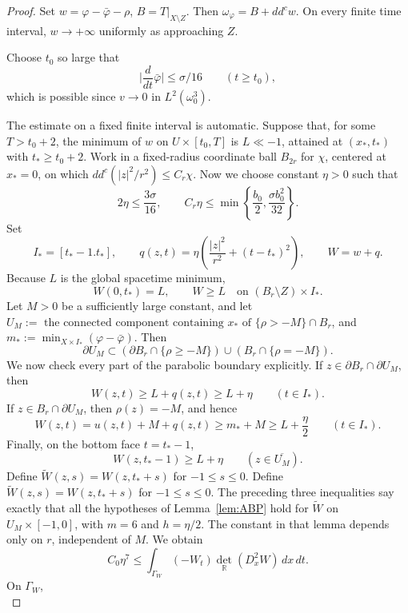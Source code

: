 \documentclass[reqno]{amsart}
\theoremstyle{remark}
\theoremstyle{plain}
\begin{document}
\begin{proof}
    Set $w=\varphi-\bar{\varphi}-\rho$, $B=T|_{X\setminus Z}$. Then $\omega_\varphi=B+dd^cw$. 
On every finite time interval, $w\to+\infty$ uniformly as approaching 
$Z$.

Choose $t_0$ so large that
\[
\big|\frac{d}{dt}\bar{\varphi}\big|\leq\sigma/16\qquad(t\geq t_0),
\]which is possible since $v\to 0$ in $L^2(\omega_0^3)$. 

The estimate on a fixed finite interval is automatic.  Suppose that,
for some $T>t_0+2$, the minimum of $w$ on
$U\times[t_0,T]$ is $L\ll-1$, attained at
$(x_*,t_*)$ with $t_*\geq t_0+2$.  Work in a fixed-radius
coordinate ball $B_{2r}$ for $\chi$, centered
at $x_*=0$, on which $dd^c(|z|^2/r^2)\leq C_r\chi$. Now we choose constant $\eta>0$ such that \begin{equation}\label{eq:eta-choice}
 2\eta\leq\frac{3\sigma}{16},\qquad
 C_r\eta\leq
 \min\left\{\frac{b_0}{2},\frac{\sigma b_0^2}{32}\right\}.
\end{equation}
Set \[
I_*=[t_*-1.t_*], \qquad q(z,t)=\eta\left(\frac{|z|^2}{r^2}+(t-t_*)^2\right),
 \qquad W=w+q.
\]
Because $L$ is the global spacetime minimum,
\[
 W(0,t_*)=L,\qquad W\geq L
 \quad\text{on }(B_r\setminus Z)\times I_*.
\]
Let $M>0$ be a sufficiently large constant, and let $U_M:=\text{ the connected component containing $x_*$ of }\{\rho>-M\}\cap B_{r}$, and $m_*:=\min_{X\times I_*}(\varphi-\bar\varphi).$ Then \[
\partial U_M\subset (\partial B_r\cap\{\rho\geq -M\})\cup(B_r\cap\{\rho=-M\}).
\]
We now check every part of the parabolic boundary explicitly.  If
$z\in\partial B_r\cap\partial U_M$, then
\[
 W(z,t)\geq L+q(z,t)\geq L+\eta
 \qquad(t\in I_*).
\]
If $z\in B_r\cap\partial U_M$, then
$\rho(z)=-M$, and hence
\[
 W(z,t)=u(z,t)+M+q(z,t)
 \geq m_*+M\geq L+\frac\eta2
 \qquad(t\in I_*).
\]
Finally, on the bottom face $t=t_*-1$,
\[
 W(z,t_*-1)\geq L+\eta
 \qquad(z\in\overline{U_M}).
\]
Define $\widetilde W(z,s)=W(z,t_*+s)$ for $-1\leq s\leq0$.
Define $\widetilde W(z,s)=W(z,t_*+s)$ for $-1\leq s\leq0$.
The preceding three inequalities say exactly that all the hypotheses
of Lemma~\ref{lem:ABP} hold for $\widetilde W$ on
$U_M\times[-1,0]$, with $m=6$ and $h=\eta/2$.  The
constant in that lemma depends only on $r$, independent of $M$.  We obtain
\begin{equation}\label{eq:ABP-applied}
 C_0\eta^7
 \leq
 \int_{\Gamma_W}(-W_t)\det_{\mathbb R}(D_x^2W)\,dx\,dt.
\end{equation}
On $\Gamma_W$,
\begin{equation}\label{eq:contact-data}

\end{equation}
\end{proof}
\end{document}
